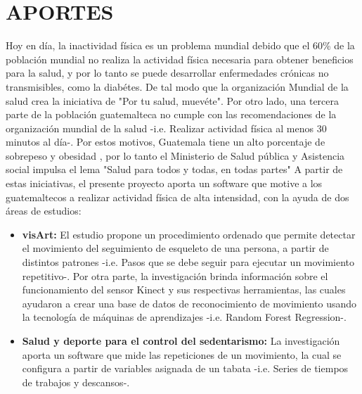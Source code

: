 \section{APORTES}
Hoy en d\'ia, la inactividad f\'isica es un problema mundial debido que el 60\% de la poblaci\'on mundial no realiza la actividad f\'isica necesaria para obtener beneficios para la salud, y por lo tanto se puede desarrollar enfermedades cr\'onicas no transmisibles, como la diab\'etes. De tal modo que la organizaci\'on Mundial de la salud crea la iniciativa de "Por tu salud, muev\'ete". \cite{orgSaludAF}
\medbreak
Por otro lado, una tercera parte de la poblaci\'on guatemalteca no cumple con las recomendaciones de la organizaci\'on mundial de la salud -i.e. Realizar actividad f\'isica al menos 30 minutos al d\'ia-. Por estos motivos, Guatemala tiene un alto porcentaje de sobrepeso y obesidad , por lo tanto el Ministerio de Salud p\'ublica y Asistencia social impulsa el lema "Salud para todos y todas, en todas partes" \cite{minSaludPub}
\medbreak
A partir de estas iniciativas, el presente proyecto aporta un software que motive a los guatemaltecos a realizar actividad f\'isica de alta intensidad, con la ayuda de dos \'areas de estudios:
\begin{itemize}
	\item \textbf{\gls{visArt}:} El estudio propone un procedimiento ordenado que permite detectar el movimiento del seguimiento de esqueleto de una persona, a partir de distintos patrones -i.e. Pasos que se debe seguir para ejecutar un movimiento repetitivo-. Por otra parte, la investigaci\'on brinda informaci\'on sobre el funcionamiento del sensor Kinect y sus respectivas herramientas, las cuales ayudaron a crear una base de datos de reconocimiento de  movimiento usando la tecnolog\'ia de m\'aquinas de aprendizajes -i.e. Random Forest Regression-.
	\item \textbf{Salud y deporte para el control del sedentarismo:} La investigaci\'on aporta un software que mide las repeticiones de un movimiento, la cual se configura a partir de variables asignada de un tabata -i.e. Series de tiempos de trabajos y descansos-.
\end{itemize}
